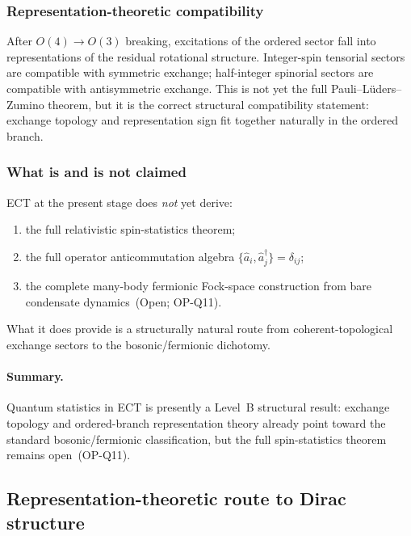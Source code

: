 \documentclass[11pt,a4paper]{article}
\numberwithin{equation}{section}
\begin{document}
\subsubsection*{Representation-theoretic compatibility}

After $O(4)\to O(3)$ breaking, excitations of the ordered sector fall
into representations of the residual rotational structure.
Integer-spin tensorial sectors are compatible with symmetric exchange;
half-integer spinorial sectors are compatible with antisymmetric
exchange.
This is not yet the full Pauli--L\"uders--Zumino theorem, but it is
the correct structural compatibility statement: exchange topology and
representation sign fit together naturally in the ordered branch.

\subsubsection*{What is and is not claimed}

ECT at the present stage does \emph{not} yet derive:
\begin{enumerate}[label=(\roman*)]
  \item the full relativistic spin-statistics theorem;
  \item the full operator anticommutation algebra
    $\{\hat a_i,\hat a_j^\dagger\}=\delta_{ij}$;
  \item the complete many-body fermionic Fock-space construction
    from bare condensate dynamics~(Open; OP-Q11).
\end{enumerate}
What it does provide is a structurally natural route from
coherent-topological exchange sectors to the bosonic/fermionic
dichotomy.

\paragraph{Summary.}
Quantum statistics in ECT is presently a Level~B structural result:
exchange topology and ordered-branch representation theory already
point toward the standard bosonic/fermionic classification, but the
full spin-statistics theorem remains open~(OP-Q11).

\subsection{Representation-theoretic route to Dirac structure}
\label{sec:qs_dirac}
\end{document}
